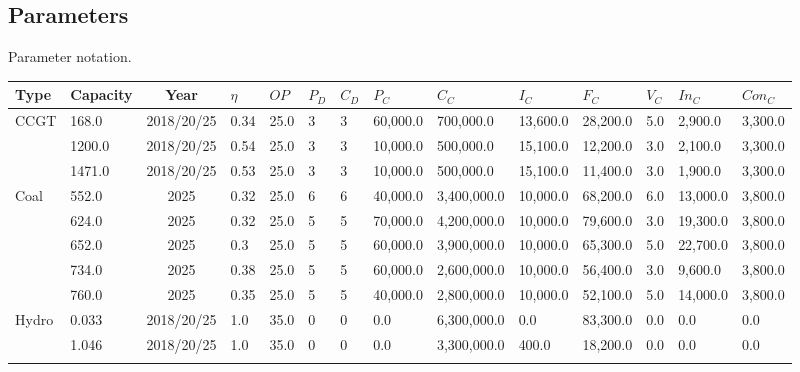 
\clearpage
\subsection{Parameters}


\begin{table}[h]
	\centering
	\caption{Parameter notation.}
\end{table}



\begin{table*}[]
	\begin{tabularx}{\linewidth}{|p{}|l|c|l|l|l|l|l|l|l|l|l|l|l|}
\hline
Type & Capacity & Year & $\eta$ & $OP$ & $P_D$ & $C_D$ & $P_C$ & $C_C$ & $I_C$ & $F_C$ & $V_C$ & $In_C$ & $Con_C$ \\ \hline
\multirow{3}{*}{CCGT} & 168.0 & 2018/20/25 & 0.34 & 25.0 & 3 & 3 & 60,000.0 & 700,000.0 & 13,600.0 & 28,200.0 & 5.0 & 2,900.0 & 3,300.0 \\ \cline{2-14} 
& 1200.0 & 2018/20/25 & 0.54 & 25.0 & 3 & 3 & 10,000.0 & 500,000.0 & 15,100.0 & 12,200.0 & 3.0 & 2,100.0 & 3,300.0 \\ \cline{2-14} 
& 1471.0 & 2018/20/25 & 0.53 & 25.0 & 3 & 3 & 10,000.0 & 500,000.0 & 15,100.0 & 11,400.0 & 3.0 & 1,900.0 & 3,300.0 \\ \hline
\multirow{5}{*}{Coal} & 552.0 & 2025 & 0.32 & 25.0 & 6 & 6 & 40,000.0 & 3,400,000.0 & 10,000.0 & 68,200.0 & 6.0 & 13,000.0 & 3,800.0 \\ \cline{2-14} 
& 624.0 & 2025 & 0.32 & 25.0 & 5 & 5 & 70,000.0 & 4,200,000.0 & 10,000.0 & 79,600.0 & 3.0 & 19,300.0 & 3,800.0 \\ \cline{2-14} 
& 652.0 & 2025 & 0.3 & 25.0 & 5 & 5 & 60,000.0 & 3,900,000.0 & 10,000.0 & 65,300.0 & 5.0 & 22,700.0 & 3,800.0 \\ \cline{2-14} 
& 734.0 & 2025 & 0.38 & 25.0 & 5 & 5 & 60,000.0 & 2,600,000.0 & 10,000.0 & 56,400.0 & 3.0 & 9,600.0 & 3,800.0 \\ \cline{2-14} 
& 760.0 & 2025 & 0.35 & 25.0 & 5 & 5 & 40,000.0 & 2,800,000.0 & 10,000.0 & 52,100.0 & 5.0 & 14,000.0 & 3,800.0 \\ \hline
\multirow{3}{*}{Hydro} & 0.033 & 2018/20/25 & 1.0 & 35.0 & 0 & 0 & 0.0 & 6,300,000.0 & 0.0 & 83,300.0 & 0.0 & 0.0 & 0.0 \\ \cline{2-14} 
& 1.046 & 2018/20/25 & 1.0 & 35.0 & 0 & 0 & 0.0 & 3,300,000.0 & 400.0 & 18,200.0 & 0.0 & 0.0 & 0.0 \\ \cline{2-14} 

\end{tabularx}
\end{table*}
